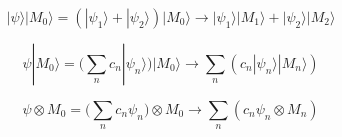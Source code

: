\documentclass[20pt]{extreport}
\def\a{|\psi_1\rangle}
\def\b{|\psi_2\rangle}
\def\da{|M_{1}\rangle}
\def\db{|M_{2}\rangle}
\def\m0{| M_0 \rangle}
\def\M0{ M_0 }
\begin{document}
$$\displaystyle |\psi\rangle \m0 = (\a + \b)\m0 \to   \a\da + \b\db
$$

$$\displaystyle \psi  \m0 = \big(\sum_n c_n|\psi_n\rangle\big)  \m0 \to  \sum_n (c_n |\psi_n\rangle  |M_n\rangle)
$$

$$\displaystyle \psi  \otimes \M0 = \big(\sum_n c_n\psi_n\big) \otimes \M0 \to  \sum_n (c_n \psi_n  \otimes M_n)
$$
\end{document}

